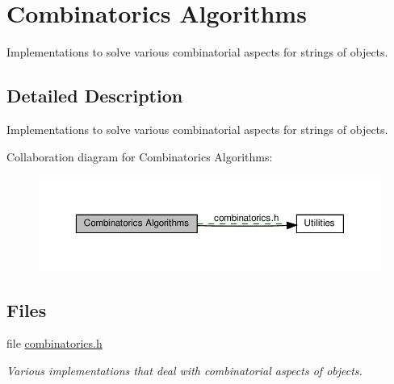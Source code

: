 \hypertarget{group__combinatorics__utils}{}\section{Combinatorics Algorithms}
\label{group__combinatorics__utils}


Implementations to solve various combinatorial aspects for strings of objects.  




\subsection{Detailed Description}
Implementations to solve various combinatorial aspects for strings of objects. 

Collaboration diagram for Combinatorics Algorithms\+:
\nopagebreak
\begin{figure}[H]
\begin{center}
\leavevmode
\includegraphics[width=350pt]{group__combinatorics__utils}
\end{center}
\end{figure}
\subsection*{Files}
\begin{DoxyCompactItemize}
\item 
file \hyperlink{combinatorics_8h}{combinatorics.\+h}
\begin{DoxyCompactList}\small\item\em Various implementations that deal with combinatorial aspects of objects. \end{DoxyCompactList}\end{DoxyCompactItemize}
